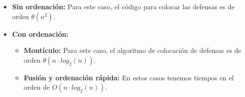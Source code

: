\begin{itemize}
	\item \textbf{Sin ordenación:} Para este caso, el código para colocar las defensas es de orden $\theta(n^2)$.
	\item \textbf{Con ordenación:}
	\begin{itemize}
		\item \textbf{Montículo:} Para este caso, el algoritmo de colocación de defensas es de orden $\theta(n\cdot log_{2}(n))$.
		\item \textbf{Fusión y ordenación rápida:} En estos casos tenemos tiempos en el orden de  $O(n\cdot log_{2}(n))$.
	\end{itemize}
\end{itemize}
